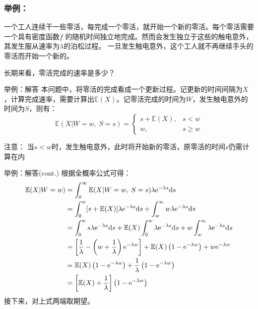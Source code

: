 \documentclass[t]{beamer}
\newcommand{\E}{\mathbb{E}}
\begin{document}
\begin{frame}
  \frametitle{举例：}
  一个工人连续干一些零活，每完成一个零活，就开始一个新的零活。每个零活需要一个具有密度函数$f$ 的随机时间独立地完成。然而会发生独立于这些的触电意外，其发生服从速率为$\lambda$的泊松过程。
  一旦发生触电意外，这个工人就不再继续手头的零活而开始一个新的。
  
  长期来看，零活完成的速率是多少？
  

\end{frame}

\begin{frame}{举例：解答}
  本问题中，将零活的完成看成一个更新过程。记更新的时间间隔为$X$，计算完成速率，需要计算出$\E(X)$。记零活完成的时间为$W$，发生触电意外的时间为$S$，则有：
\[\E(X|W=w,\; S=s)=\begin{cases}
  s+\E(X), & s<w\\
  w, & s\ge w
\end{cases}\]

\begin{block}{注意：}
  当$s<w$时，发生触电意外，此时将开始新的零活，原零活的时间$s$仍需计算在内
\end{block}
\end{frame}

\begin{frame}{举例：解答(cont.)}
  根据全概率公式可得：
  \[\begin{split}
    \E(X|W=w)&=\int^{\infty}_0 \E(X|W=w,\; S=s) \lambda {\rm e}^{-\lambda s}\dd s\\
  &=\int^w_0  [s+\E(X)]\lambda {\rm e}^{-\lambda s}\dd s  +\int^{\infty}_w w\lambda {\rm e}^{-\lambda s}\dd s\\
  &=\int^w_0 s\lambda {\rm e}^{-\lambda s} \dd s +\E(X)\int^w_0 \lambda {\rm e}^{-\lambda s}  \dd s + w\int^{\infty}_w \lambda {\rm e}^{-\lambda s}\dd s\\
  &=\left[\frac{1}{\lambda}-\left(w+\frac{1}{\lambda}\right){\rm e}^{-\lambda w}\right]+\E(X)\left(1-{\rm e}^{-\lambda w}\right)+w{\rm e}^{-\lambda w}\\
  &=\E(X)\left(1-{\rm e}^{-\lambda w}\right)+\frac{1}{\lambda}\left(1-{\rm e}^{-\lambda w}\right)\\
  &=\left[\E(X)+\frac{1}{\lambda}\right]\left(1-{\rm e}^{-\lambda w}\right)
  \end{split}\]
接下来，对上式两端取期望。
\end{frame}
\end{document}
